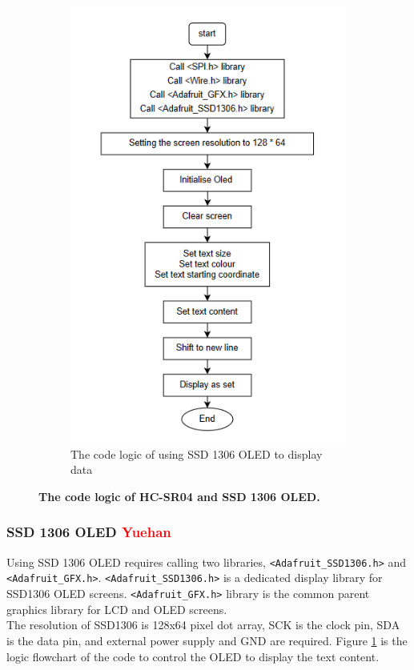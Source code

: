 \begin{figure}[H]
\begin{subfigure}{0.40\textwidth}
        \includegraphics[width=\linewidth]{Image/Design/code_logic_display.png}
        \caption{\centering The code logic of using SSD 1306 OLED to display data}
        \label{fig:cl_oled}
    \end{subfigure}
    \caption[The code logic of HC-SR04 and SSD 1306 OLED]
    {\centering \textbf{The code logic of HC-SR04 and SSD 1306 OLED.}}
    \label{fig:cl_tof_oled}
\end{figure}
\subsubsection{SSD 1306 OLED \textcolor{red}{Yuehan}}
Using SSD 1306 OLED requires calling two libraries, \lstinline{<Adafruit_SSD1306.h>} and 
\lstinline{<Adafruit_GFX.h>}. \lstinline{<Adafruit_SSD1306.h>} is a dedicated display library for SSD1306 OLED 
screens. \lstinline{<Adafruit_GFX.h>} library is the common parent graphics library for LCD and OLED screens. \\
The resolution of SSD1306 is 128x64 pixel dot array, SCK is the clock pin, SDA is the data pin, and external 
power supply and GND are required. Figure \ref{fig:cl_oled} is the logic flowchart of the code to control the 
OLED to display the text content.
\newpage 